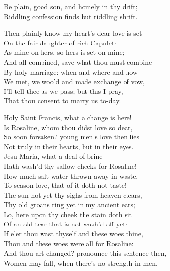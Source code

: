 \begin{speech}
Be plain, good son, and homely in thy drift; \\

Riddling confession finds but riddling shrift. \\
\end{speech}
\begin{speech}
Then plainly know my heart's dear love is set \\
On the fair daughter of rich Capulet: \\
As mine on hers, so hers is set on mine; \\
And all combined, save what thou must combine \\
By holy marriage: when and where and how \\
We met, we woo'd and made exchange of vow, \\
I'll tell thee as we pass; but this I pray, \\
That thou consent to marry us to-day. \\
\end{speech}
\begin{speech}
Holy Saint Francis, what a change is here! \\
Is Rosaline, whom thou didst love so dear, \\
So soon forsaken? young men's love then lies \\
Not truly in their hearts, but in their eyes. \\
Jesu Maria, what a deal of brine \\
Hath wash'd thy sallow cheeks for Rosaline! \\
How much salt water thrown away in waste, \\
To season love, that of it doth not taste! \\
The sun not yet thy sighs from heaven clears, \\
Thy old groans ring yet in my ancient ears; \\
Lo, here upon thy cheek the stain doth sit \\
Of an old tear that is not wash'd off yet: \\
If e'er thou wast thyself and these woes thine, \\
Thou and these woes were all for Rosaline: \\
And thou art changed? pronounce this sentence then, \\
Women may fall, when there's no strength in men. \\
\end{speech}
